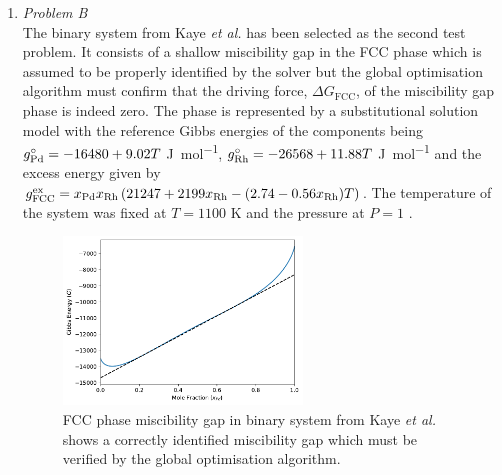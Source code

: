 \begin{enumerate}
	
	\item	\emph{Problem B}\\
		The binary   system from Kaye \textit{et al.} \cite{Kaye07} has been selected as the second test problem. It consists of a shallow miscibility gap in the FCC phase which is assumed to be properly identified by the solver but the global optimisation algorithm must confirm that the driving force, $\Delta G_\text{FCC}$, of the miscibility gap phase is indeed zero. The phase is represented by a substitutional solution model with the reference Gibbs energies of the components being $g_{\ce{Pd}}^\circ = -16480 + 9.02T$ \si{\joule \per \mole}, $g_{\ce{Rh}}^\circ = -26568 + 11.88 T$ \si{\joule \per \mole} and the excess energy given by $g_\text{FCC}^\text{ex} = x_{\ce{Pd}}x_{\ce{Rh}} \left(21247 + 2199 x_{\ce{Rh}} - (2.74 - 0.56x_{\ce{Rh}})T\right)$. The temperature of the system was fixed at $T = 1100$ \si{\kelvin} and the pressure at $P=1$ \si{\atmosphere}.
		\begin{figure}[htbp]			
			\centering
			\includegraphics[width=0.6\textwidth]{figures/chapter-6/System_PdRh.pdf}
			\caption[Global optimisation test problem B: FCC phase miscibility gap in  binary system.]{FCC phase miscibility gap in  binary system from Kaye \textit{et al.} \cite{Kaye07} shows a correctly identified miscibility gap which must be verified by the global optimisation algorithm.}
			\label{fig:testB}
		\end{figure}


\end{enumerate}
